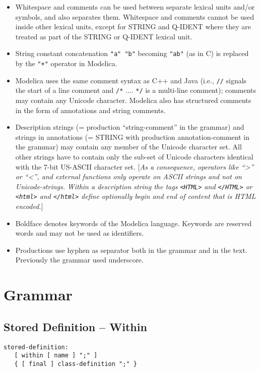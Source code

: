 \begin{itemize}
\item
  Whitespace and comments can be used between separate lexical units
  and/or symbols, and also separates them. Whitespace and comments
  cannot be used inside other lexical units, except for STRING and
  Q-IDENT where they are treated as part of the STRING or Q-IDENT
  lexical unit.
\item
  String constant concatenation \lstinline!"a" "b"! becoming \lstinline!"ab"! (as in C) is
  replaced by the \lstinline!"+"! operator in Modelica.
\item
  Modelica uses the same comment syntax as C++ and Java (i.e., \lstinline!//!
  signals the start of a line comment and \lstinline!/*! .... \lstinline!*/! is a multi-line
  comment); comments may contain any Unicode character. Modelica also
  has structured comments in the form of annotations and string
  comments.
\item
  Description strings (= production ``string-comment'' in the grammar)
  and strings in annotations (= STRING with production annotation-comment in the
  grammar) may contain any member of the Unicode character set. All
  other strings have to contain only the sub-set of Unicode characters
  identical with the 7-bit US-ASCII character set. {[}\emph{As a
  consequence, operators like ``\textgreater{}'' or ``\textless{}'', and
  external functions only operate on ASCII strings and not on
  Unicode-strings.} \emph{Within a description string the tags
  \lstinline!<HTML>! and \lstinline!</HTML>! or
  \lstinline!<html>! and \lstinline!</html>!
  define optionally begin and end of content that is HTML encoded.}{]}
\item
  Boldface denotes keywords of the Modelica language. Keywords are
  reserved words and may not be used as identifiers.
\item
  Productions use hyphen as separator both in the grammar and in the
  text. Previously the grammar used underscore.
\end{itemize}

\section{Grammar}
\subsection{Stored Definition -- Within}
\begin{lstlisting}[language=grammar]
stored-definition:
   [ within [ name ] ";" ]
   { [ final ] class-definition ";" }
\end{lstlisting}

